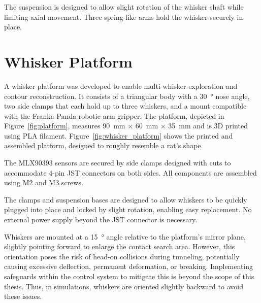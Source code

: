 The suspension is designed to allow slight rotation of the whisker shaft while limiting axial movement.
Three spring-like arms hold the whisker securely in place.


\section{Whisker Platform}

A whisker platform was developed to enable multi-whisker exploration and contour reconstruction.
It consists of a triangular body with a \SI{30}{\degree} nose angle, two side clamps that each hold up to three whiskers, and a mount compatible with the Franka Panda robotic arm gripper.
The platform, depicted in Figure~\ref{fig:platform}, measures \SI{90}{\milli\meter} $\times$ \SI{60}{\milli\meter} $\times$ \SI{35}{\milli\meter} and is 3D printed using PLA filament.
Figure~\ref{fig:whisker_platform} shows the printed and assembled platform, designed to roughly resemble a rat’s shape.

The MLX90393 sensors are secured by side clamps designed with cuts to accommodate 4-pin JST connectors on both sides.
All components are assembled using M2 and M3 screws.

The clamps and suspension bases are designed to allow whiskers to be quickly plugged into place and locked by slight rotation, enabling easy replacement.
No external power supply beyond the JST connector is necessary.

Whiskers are mounted at a \SI{15}{\degree} angle relative to the platform’s mirror plane, slightly pointing forward to enlarge the contact search area.
However, this orientation poses the risk of head-on collisions during tunneling, potentially causing excessive deflection, permanent deformation, or breaking.
Implementing safeguards within the control system to mitigate this is beyond the scope of this thesis.
Thus, in simulations, whiskers are oriented slightly backward to avoid these issues.

